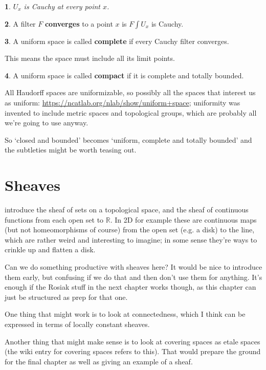 \documentclass[oneside,english]{amsbook}
\numberwithin{section}{chapter}
\theoremstyle{plain}
\newtheorem{thm}{\protect\theoremname}
\theoremstyle{definition}
\newtheorem{defn}[thm]{\protect\definitionname}
\providecommand{\definitionname}{Definition}
\providecommand{\theoremname}{Theorem}
\begin{document}
\begin{thm}
	$U_x$ is Cauchy at every point $x$.
\end{thm}

\begin{defn}
	A filter $F$ \textbf{converges} to a point $x$ is $F\int U_x$ is Cauchy.
\end{defn}

\begin{defn}
	A uniform space is called \textbf{complete} if every Cauchy filter converges.
\end{defn}

This means the space must include all its limit points. 

\begin{defn}
	A uniform space is called \textbf{compact} if it is complete and totally bounded.
\end{defn}

All Haudorff spaces are uniformizable, so possibly all the spaces that interest us as uniform: \url{https://ncatlab.org/nlab/show/uniform+space}; uniformity was invented to include metric spaces and topological groups, which are probably all we're going to use anyway. 

So `closed and bounded' becomes `uniform, complete and totally bounded' and the subtleties might be worth teasing out.


\chapter{Sheaves}

	introduce the sheaf of sets on a topological space, and the sheaf of continuous functions from each open set to $\mathbb{R}$. In 2D for example these are continuous maps (but not homeomorphisms of course) from the open set (e.g. a disk) to the line, which are rather weird and interesting to imagine; in some sense they're ways to crinkle up and flatten a disk.
	
	Can we do something productive with sheaves here? It would be nice to introduce them early, but confusing if we do that and then don't use them for anything. It's enough if the Rosiak stuff in the next chapter works though, as this chapter can just be structured as prep for that one.
	
	One thing that might work is to look at connectedness, which I think can be expressed in terms of locally constant sheaves.
	
	Another thing that might make sense is to look at covering spaces as etale spaces (the wiki entry for covering spaces refers to this). That would prepare the ground for the final chapter as well as giving an example of a sheaf.
\end{document}
